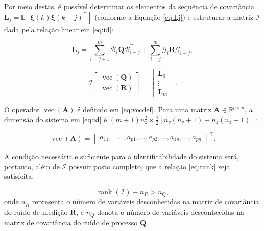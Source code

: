 \documentclass[journal]{IEEEtran}
\begin{document}
Por meio destas, é possível determinar os elementos da sequência de covariância $\mathbf{L}_j = \mathbb{E}[\mathbf{\xi}(k)\mathbf{\xi}(k-j)^\top]$ (conforme a Equação \eqref{eq:Lj}) e estruturar a matriz $\mathbf{\mathcal{I}}$ dada pela relação linear em \eqref{eq:id}:

\begin{equation}
    \label{eq:Lj}
     \mathbf{L}_j = \sum_{i=j+1}^m \mathbf{\mathcal{B}}_i \mathbf{Q} \mathbf{\mathcal{B}}_{i-j}^\top + \sum_{i=j}^m \mathbf{\mathcal{G}}_i \mathbf{R} \mathbf{\mathcal{G}}_{i-j}^\top,
\end{equation}

\begin{equation}
    \label{eq:id}
    \mathbf{\mathcal{I}} \begin{bmatrix} \operatorname{vec}(\mathbf{Q}) \\ \operatorname{vec}(\mathbf{R}) \end{bmatrix} = \begin{bmatrix} \mathbf{L}_0 \\ \vdots \\ \mathbf{L}_m \end{bmatrix}.
\end{equation}

O operador $\operatorname{vec}(\mathbf{A})$ é definido em \eqref{eq:vecdef}. Para uma matriz $\mathbf{A} \in \mathbb{R}^{p\times n}$, a dimensão do sistema em \eqref{eq:id} é $(m+1)n_z^2 \times \frac{1}{2}[n_v(n_v+1)+n_z(n_z+1)]$:

\begin{equation}
    \label{eq:vecdef}
    \operatorname{vec}(\mathbf{A}) = \begin{bmatrix}
        a_{11}, & \dots, a_{p1}, \dots, a_{p2}, \dots, a_{1n}, \dots, a_{pn}
    \end{bmatrix}^\top.
\end{equation}

A condição necessária e suficiente para a identificabilidade do sistema será, portanto, além de $\mathbf{\mathcal{I}}$ possuir posto completo, que a relação \eqref{eq:rank} seja satisfeita.

\begin{equation}
    \label{eq:rank}
    \operatorname{rank}(\mathbf{\mathcal{I}}) - n_R > n_Q,
\end{equation}
onde $n_R$ representa o número de variáveis desconhecidas na matriz de covariância do ruído de medição $\mathbf{R}$, e $n_Q$ denota o número de variáveis desconhecidas na matriz de covariância do ruído de processo $\mathbf{Q}$.
\end{document}
